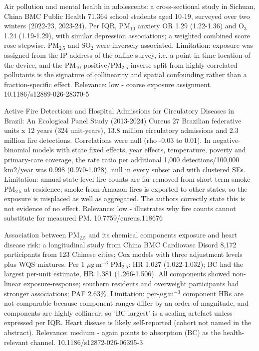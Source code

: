 \documentclass[10pt]{article}
\begin{document}

{Air pollution and mental health in adolescents: a cross-sectional study in Sichuan, China}
{BMC Public Health}
{71,364 school students aged 10-19, surveyed over two winters (2022-23, 2023-24). Per IQR, PM$_{10}$ anxiety OR 1.29 (1.22-1.36) and O$_3$ 1.24 (1.19-1.29), with similar depression associations; a weighted combined score rose stepwise. PM$_{2.5}$ and SO$_2$ were inversely associated. Limitation: exposure was assigned from the IP address of the online survey, i.e. a point-in-time location of the device, and the PM$_{10}$-positive/PM$_{2.5}$-inverse split from highly correlated pollutants is the signature of collinearity and spatial confounding rather than a fraction-specific effect. Relevance: low - coarse exposure assignment.}
{10.1186/s12889-026-28370-5}

\par{}\baselineskip{}\baselineskip
{}

{Active Fire Detections and Hospital Admissions for Circulatory Diseases in Brazil: An Ecological Panel Study (2013-2024)}
{Cureus}
{27 Brazilian federative units x 12 years (324 unit-years), 13.8 million circulatory admissions and 2.3 million fire detections. Correlations were null (rho -0.03 to 0.01). In negative-binomial models with state fixed effects, year effects, temperature, poverty and primary-care coverage, the rate ratio per additional 1,000 detections/100,000 km2/year was 0.998 (0.970-1.028), null in every subset and with clustered SEs. Limitation: annual state-level fire counts are far removed from short-term smoke PM$_{2.5}$ at residence; smoke from Amazon fires is exported to other states, so the exposure is misplaced as well as aggregated. The authors correctly state this is not evidence of no effect. Relevance: low - illustrates why fire counts cannot substitute for measured PM.}
{10.7759/cureus.118676}

{Association between PM$_{2.5}$ and its chemical components exposure and heart disease risk: a longitudinal study from China}
{BMC Cardiovasc Disord}
{8,172 participants from 123 Chinese cities; Cox models with three adjustment levels plus WQS mixtures. Per 1 $\mu$g\,m$^{-3}$ PM$_{2.5}$: HR 1.027 (1.022-1.032); BC had the largest per-unit estimate, HR 1.381 (1.266-1.506). All components showed non-linear exposure-response; southern residents and overweight participants had stronger associations; PAF 2.63\%. Limitation: per-$\mu$g\,m$^{-3}$ component HRs are not comparable because component ranges differ by an order of magnitude, and components are highly collinear, so 'BC largest' is a scaling artefact unless expressed per IQR. Heart disease is likely self-reported (cohort not named in the abstract). Relevance: medium - again points to absorption (BC) as the health-relevant channel.}
{10.1186/s12872-026-06395-3}
\end{document}
